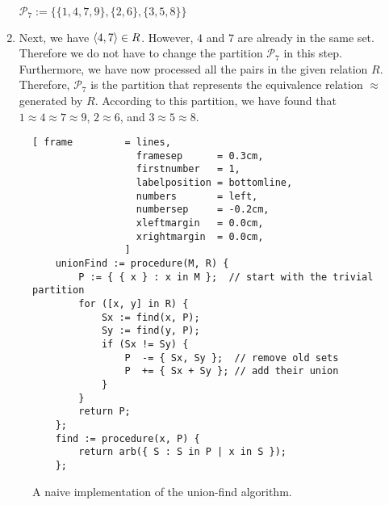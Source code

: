 \begin{enumerate}
      \\[0.2cm]
      \hspace*{1.3cm}
      $\mathcal{P}_7 := \bigl\{ \{1, 4, 7, 9\}, \{2,6\}, \{3,5,8\} \bigr\}$
\item Next, we have $\pair(4,7) \in R$.  However, $4$ and $7$ are already in the same set.
      Therefore we do not have to change the partition $\mathcal{P}_7$ in this step.
      Furthermore, we have now processed all the pairs in the given relation $R$.
      Therefore, $\mathcal{P}_7$ is the partition that represents the equivalence relation $\approx$ generated
      by $R$.  According to this partition, we have found that
      \\[0.2cm]
      \hspace*{1.3cm}
      $1 \approx 4 \approx 7 \approx 9$, \quad $2 \approx 6$,  \quad and \quad $3 \approx 5 \approx 8$.
\end{enumerate}
 

\begin{figure}[!ht]
\centering
\begin{Verbatim}[ frame         = lines, 
                  framesep      = 0.3cm, 
                  firstnumber   = 1,
                  labelposition = bottomline,
                  numbers       = left,
                  numbersep     = -0.2cm,
                  xleftmargin   = 0.0cm,
                  xrightmargin  = 0.0cm,
                ]
    unionFind := procedure(M, R) {
        P := { { x } : x in M };  // start with the trivial partition
        for ([x, y] in R) {
            Sx := find(x, P);
            Sy := find(y, P);
            if (Sx != Sy) {
                P  -= { Sx, Sy };  // remove old sets
                P  += { Sx + Sy }; // add their union
            }
        }
        return P;
    };
    find := procedure(x, P) {
        return arb({ S : S in P | x in S });
    };
\end{Verbatim}
\vspace*{-0.3cm}
\caption{A naive implementation of the union-find algorithm.}
\label{fig:union-find-naive.stlx}
\end{figure}


